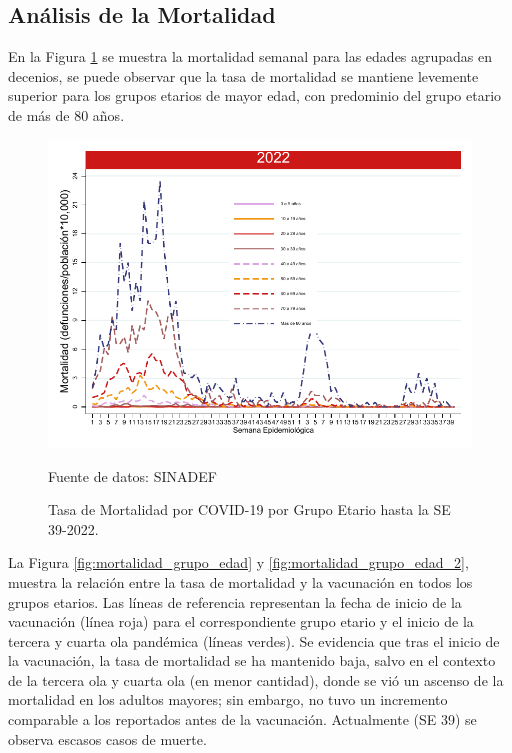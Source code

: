 \documentclass[12pt,a4paper,openany]{book}
\begin{document}
	\subsection*{Análisis de la Mortalidad}
	
	\noindent En la Figura \ref{fig:mortalidad_edad} se muestra la mortalidad semanal para las edades agrupadas en decenios,  se puede observar que la tasa de mortalidad se mantiene levemente superior para los grupos etarios de mayor edad, con predominio del grupo etario de más de 80 años.
	
	\begin{figure}[h]
		\caption{Tasa de Mortalidad por COVID-19 por Grupo Etario hasta la SE 39-2022.}\label{fig:mortalidad_edad}
		\begin{center}
			\includegraphics[width=0.65\linewidth]{../figuras/mortalidad_edad_2021_2022.pdf}
		\end{center}
		{\footnotesize Fuente de datos: SINADEF} 
	\end{figure}
	
	
	La Figura \ref{fig:mortalidad_grupo_edad} y 
	\ref{fig:mortalidad_grupo_edad_2},
	muestra la relación entre la tasa de mortalidad y la vacunación en todos los grupos etarios. Las líneas de referencia  representan la fecha de inicio de la vacunación (línea roja) para el correspondiente grupo etario y el inicio de la tercera y cuarta ola pandémica (líneas verdes). Se evidencia que tras el inicio de la vacunación, la tasa de mortalidad se ha mantenido baja, salvo en el contexto de la tercera ola y cuarta ola (en menor cantidad), donde se vió un ascenso de la mortalidad en los adultos mayores; sin embargo, no tuvo un incremento comparable a los reportados antes de la vacunación. Actualmente (SE 39) se observa escasos casos de muerte.
	
\end{document}

